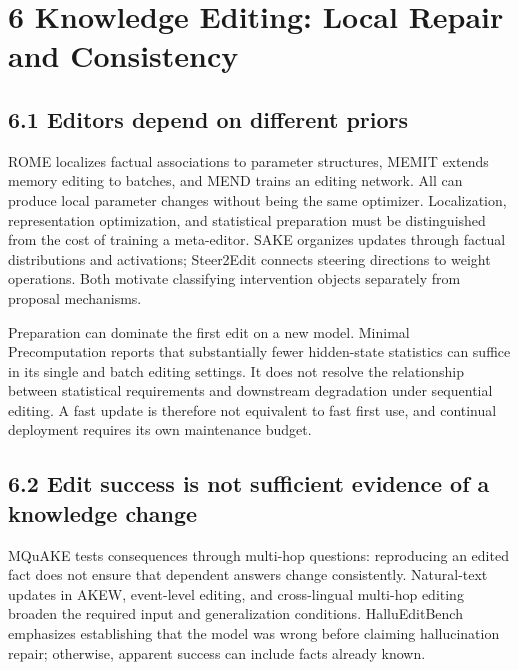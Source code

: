 \section*{6 Knowledge Editing: Local Repair and Consistency}

\subsection*{6.1 Editors depend on different priors}

ROME localizes factual associations to parameter structures, MEMIT extends memory editing to batches, and MEND trains an editing network.\cite{r4,r6,r9} All can produce local parameter changes without being the same optimizer. Localization, representation optimization, and statistical preparation must be distinguished from the cost of training a meta-editor. SAKE organizes updates through factual distributions and activations; Steer2Edit connects steering directions to weight operations.\cite{r38,r120} Both motivate classifying intervention objects separately from proposal mechanisms.


Preparation can dominate the first edit on a new model. Minimal Precomputation reports that substantially fewer hidden-state statistics can suffice in its single and batch editing settings.\cite{r40} It does not resolve the relationship between statistical requirements and downstream degradation under sequential editing. A fast update is therefore not equivalent to fast first use, and continual deployment requires its own maintenance budget.


\subsection*{6.2 Edit success is not sufficient evidence of a knowledge change}

MQuAKE tests consequences through multi-hop questions: reproducing an edited fact does not ensure that dependent answers change consistently.\cite{r16} Natural-text updates in AKEW, event-level editing, and cross-lingual multi-hop editing broaden the required input and generalization conditions.\cite{r25,r26,r30} HalluEditBench emphasizes establishing that the model was wrong before claiming hallucination repair; otherwise, apparent success can include facts already known.\cite{r34}


\begingroup\small\setlength{\tabcolsep}{5pt}\renewcommand{\arraystretch}{1.18}

